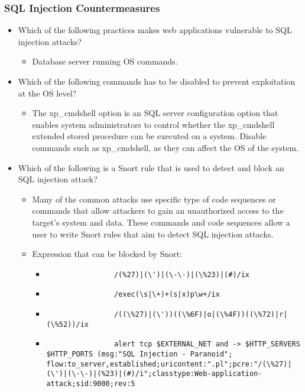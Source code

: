 \subsubsection{SQL Injection Countermeasures}
\begin{itemize}
    \item Which of the following practices makes web applications vulnerable to SQL injection attacks?
    \begin{itemize}
        \item Database server running OS commands.
    \end{itemize}
    \item Which of the following commands has to be disabled to prevent exploitation at the OS level?
    \begin{itemize}
        \item The xp\_cmdshell option is an SQL server configuration option that enables system administrators to control whether the xp\_cmdshell extended stored procedure can be executed on a system. Disable commands such as xp\_cmdshell, as they can affect the OS of the system.
    \end{itemize}
    \item Which of the following is a Snort rule that is used to detect and block an SQL injection attack?
    \begin{itemize}
        \item Many of the common attacks use specific type of code sequences or commands that allow attackers to gain an unauthorized access to the target's system and data. These commands and code sequences allow a user to write Snort rules that aim to detect SQL injection attacks.
        \item Expression that can be blocked by Snort:
        \begin{itemize}
            \item \begin{verbatim}
                /(%27)|(\')|(\-\-)|(\%23)|(#)/ix
            \end{verbatim}
            \item \begin{verbatim}
                /exec(\s|\+)+(s|x)p\w+/ix
            \end{verbatim}
            \item \begin{verbatim}
                /((\%27)|(\'))((\%6F)|o|(\%4F))((\%72)|r|(\%52))/ix
            \end{verbatim}
            \item \begin{verbatim}
                alert tcp $EXTERNAL_NET and -> $HTTP_SERVERS $HTTP_PORTS (msg:"SQL Injection - Paranoid"; flow:to_server,established;uricontent:".pl";pcre:"/(\%27)|(\')|(\-\-)|(%23)|(#)/i";classtype:Web-application-attack;sid:9000;rev:5
            \end{verbatim}
        \end{itemize}
    \end{itemize}
\end{itemize}


